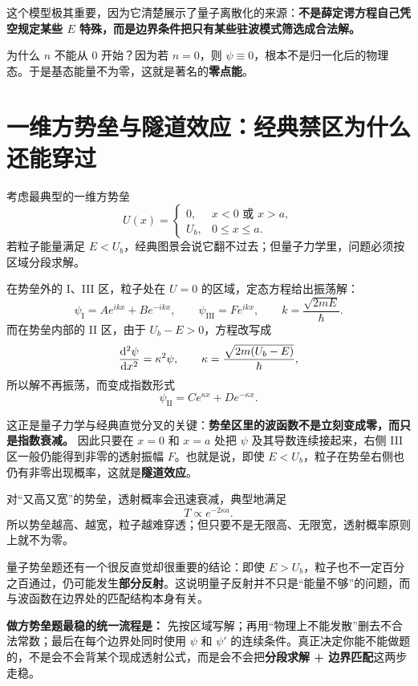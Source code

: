 \documentclass[lang=cn,11pt]{elegantbook}
\begin{document}
这个模型极其重要，因为它清楚展示了量子离散化的来源：\textbf{不是薛定谔方程自己凭空规定某些 \(E\) 特殊，而是边界条件把只有某些驻波模式筛选成合法解。}

\begin{note}
为什么 \(n\) 不能从 0 开始？因为若 \(n=0\)，则 \(\psi\equiv 0\)，根本不是归一化后的物理态。于是基态能量不为零，这就是著名的\textbf{零点能}。
\end{note}

\section{一维方势垒与隧道效应：经典禁区为什么还能穿过}

考虑最典型的一维方势垒
\[
U(x)=
\begin{cases}
0, & x<0 \text{ 或 } x>a,\\
U_b, & 0\le x\le a.
\end{cases}
\]
若粒子能量满足 \(E<U_b\)，经典图景会说它翻不过去；但量子力学里，问题必须按区域分段求解。

在势垒外的 I、III 区，粒子处在 \(U=0\) 的区域，定态方程给出振荡解：
\[
\psi_{\mathrm{I}}=A e^{ikx}+B e^{-ikx},
\qquad
\psi_{\mathrm{III}}=F e^{ikx},
\qquad
k=\frac{\sqrt{2mE}}{\hbar}.
\]
而在势垒内部的 II 区，由于 \(U_b-E>0\)，方程改写成
\[
\dv[2]{\psi}{x}=\kappa^2\psi,
\qquad
\kappa=\frac{\sqrt{2m(U_b-E)}}{\hbar},
\]
所以解不再振荡，而变成指数形式
\[
\psi_{\mathrm{II}}=C e^{\kappa x}+D e^{-\kappa x}.
\]

这正是量子力学与经典直觉分叉的关键：\textbf{势垒区里的波函数不是立刻变成零，而只是指数衰减。} 因此只要在 \(x=0\) 和 \(x=a\) 处把 \(\psi\) 及其导数连续接起来，右侧 III 区一般仍能得到非零的透射振幅 \(F\)。也就是说，即使 \(E<U_b\)，粒子在势垒右侧也仍有非零出现概率，这就是\textbf{隧道效应}。

对“又高又宽”的势垒，透射概率会迅速衰减，典型地满足
\[
T\propto e^{-2\kappa a}.
\]
所以势垒越高、越宽，粒子越难穿透；但只要不是无限高、无限宽，透射概率原则上就不为零。

\begin{remark}
量子势垒题还有一个很反直觉却很重要的结论：即使 \(E>U_b\)，粒子也不一定百分之百通过，仍可能发生\textbf{部分反射}。这说明量子反射并不只是“能量不够”的问题，而与波函数在边界处的匹配结构本身有关。
\end{remark}

\begin{note}
\textbf{做方势垒题最稳的统一流程是：} 先按区域写解；再用“物理上不能发散”删去不合法常数；最后在每个边界处同时使用 \(\psi\) 和 \(\psi'\) 的连续条件。真正决定你能不能做题的，不是会不会背某个现成透射公式，而是会不会把\textbf{分段求解 + 边界匹配}这两步走稳。
\end{note}
\end{document}
